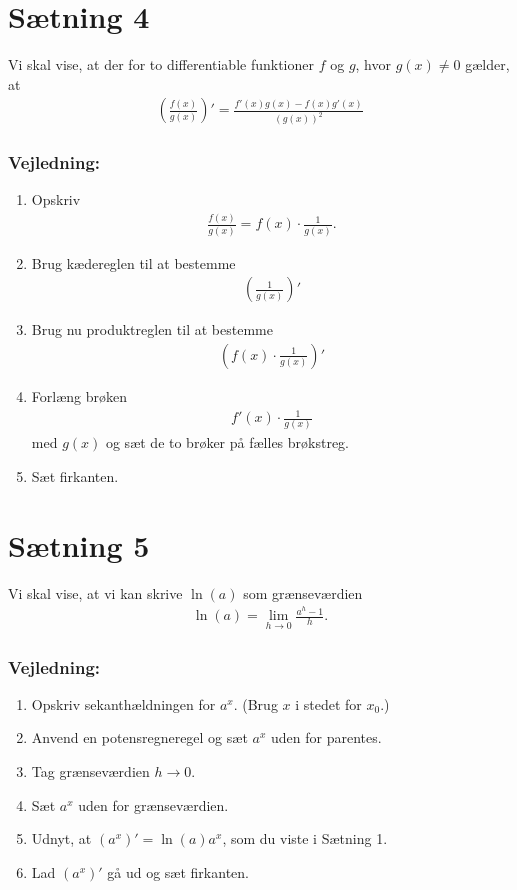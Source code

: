 \newpage
\section*{Sætning 4}

Vi skal vise, at der for to differentiable funktioner $f$ og $g$, hvor $g(x) \neq 0$ gælder, at 
\begin{align*}
	 \left(\frac{f(x)}{g(x)} \right)' = \frac{f'(x)g(x)-f(x)g'(x)}{(g(x))^2}
\end{align*}
\subsubsection*{Vejledning:}
\begin{enumerate}[label=\roman*)]
	\item Opskriv
	\begin{align*}
		\frac{f(x)}{g(x)} = f(x)\cdot \frac{1}{g(x)}.
	\end{align*}
	 \item Brug kædereglen til at bestemme 
	 \begin{align*}
	 	\left(\frac{1}{g(x)}\right)'
	 \end{align*}
	 \item Brug nu produktreglen til at bestemme 
	 \begin{align*}
	 	\left( f(x) \cdot \frac{1}{g(x)}\right)'
	 \end{align*}
	 \item Forlæng brøken 
	 \begin{align*}
	 	f'(x)\cdot \frac{1}{g(x)}
	 \end{align*}
	 med $g(x)$ og sæt de to brøker på fælles brøkstreg.
	 \item Sæt firkanten. 
\end{enumerate}

\newpage
\section*{Sætning 5}

Vi skal vise, at vi kan skrive $\ln(a)$ som grænseværdien
\begin{align*}
	\ln(a) = \lim_{h \to 0}\frac{a^h-1}{h}.
\end{align*}
\subsubsection*{Vejledning:}
\begin{enumerate}[label=\roman*)]
	\item Opskriv sekanthældningen for $a^x$. (Brug $x$ i stedet for $x_0$.)
	\item Anvend en potensregneregel og sæt $a^x$ uden for parentes. 
	\item Tag grænseværdien $h \to 0$. 
	\item Sæt $a^x$ uden for grænseværdien. 
	\item Udnyt, at $(a^x)' = \ln(a)a^x$, som du viste i Sætning 1. 
	\item Lad $(a^x)'$ gå ud og sæt firkanten. 
\end{enumerate}